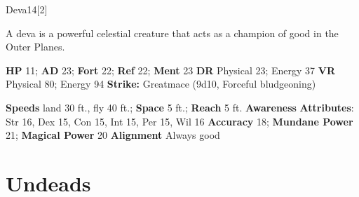   \begin{monsection}{Deva}{14}[2]
    \vspace{-1em}\vspace{-1em}
    \vspace{0em}

    
      A deva is a powerful celestial creature that acts as a champion of good in the Outer Planes.
    
    

    \begin{spellcontent}
      \begin{spelltargetinginfo}
        \pari \textbf{HP} 11;
          \textbf{AD} 23;
          \textbf{Fort} 22;
          \textbf{Ref} 22;
          \textbf{Ment} 23
        \pari \textbf{DR} Physical 23; Energy 37
        \pari \textbf{VR} Physical 80; Energy 94
        \pari \textbf{Strike:}
            Greatmace  (9d10, Forceful bludgeoning)
      \end{spelltargetinginfo}
    \end{spellcontent}
    \begin{monsterfooter}
      \pari \textbf{Speeds} land 30 ft., fly 40 ft.;
        \textbf{Space} 5 ft.;
        \textbf{Reach} 5 ft.
      \pari \textbf{Awareness} 
      \pari \textbf{Attributes}:
        Str 16, Dex 15,
        Con 15, Int 15,
        Per 15, Wil 16
      \pari \textbf{Accuracy} 18;
        \textbf{Mundane Power} 21;
      \textbf{Magical Power} 20
      \pari \textbf{Alignment} Always good
    \end{monsterfooter}
  \end{monsection}
  
  
        \section{Undeads}
      
